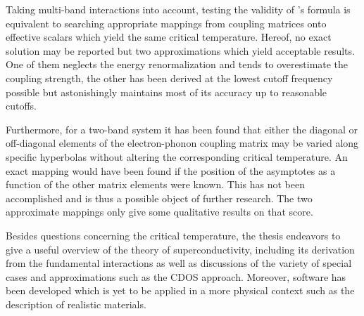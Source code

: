 Taking multi-band interactions into account, testing the validity of
's formula is equivalent to searching appropriate mappings from
coupling matrices onto effective scalars which yield the same critical
temperature. Hereof, no exact solution may be reported but two approximations
which yield acceptable results. One of them neglects the energy renormalization
and tends to overestimate the coupling strength, the other has been derived at
the lowest cutoff frequency possible but astonishingly maintains most of its
accuracy up to reasonable cutoffs.

Furthermore, for a two-band system it has been found that either the diagonal or
off-diagonal elements of the electron-phonon coupling matrix may be varied along
specific hyperbolas without altering the corresponding critical temperature. An
exact mapping would have been found if the position of the asymptotes as a
function of the other matrix elements were known. This has not been accomplished
and is thus a possible object of further research. The two approximate mappings
only give some qualitative results on that score.

Besides questions concerning the critical temperature, the thesis endeavors to
give a useful overview of the  theory of superconductivity,
including its derivation from the fundamental interactions as well as
discussions of the variety of special cases and approximations such as the CDOS
approach. Moreover, software has been developed which is yet to be applied in a
more physical context such as the description of realistic materials.
